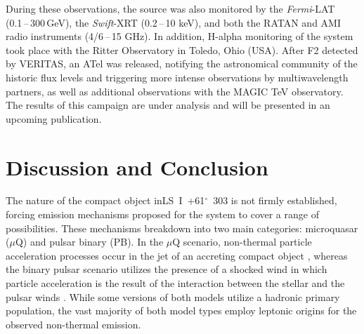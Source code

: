 \documentclass[preprint2]{aastex}
\newcommand{\lsi}{LS~I~+61$^{\circ}$~303}
\newcommand{\gev}{\,GeV}
\begin{document}
During these observations, the source was also monitored by the \emph{Fermi}-LAT (0.1\,--\,300\gev{}), the \emph{Swift}-XRT (0.2\,--\,10 keV), and both the RATAN and AMI radio instruments (4/6\,--\,15 GHz). In addition, H-alpha monitoring of the system took place with the Ritter Observatory in Toledo, Ohio (USA). After F2 detected by VERITAS, an ATel \citep{2015VTSATEL} was released, notifying the astronomical community of the historic flux levels and triggering more intense observations by multiwavelength partners, as well as additional observations with the MAGIC TeV observatory. The results of this campaign are under analysis and will be presented in an upcoming publication. 

\section{Discussion and Conclusion}
The nature of the compact object in\linebreak \lsi{} is not firmly established, forcing emission mechanisms proposed for the system to cover a range of possibilities. These mechanisms breakdown into two main categories: microquasar ($\mu$Q) and pulsar binary (PB). In the $\mu$Q scenario, non-thermal particle acceleration processes occur in the jet of an accreting compact object \citep{Massi2001,Massi2013,2015A&A...575L...9M}, whereas the binary pulsar scenario utilizes the presence of a shocked wind in which particle acceleration is the result of the interaction between the stellar and the pulsar winds \citep{Dhawan2006}. While some versions of both models utilize a hadronic primary population, the vast majority of both model types employ leptonic origins for the observed non-thermal emission.
\end{document}

